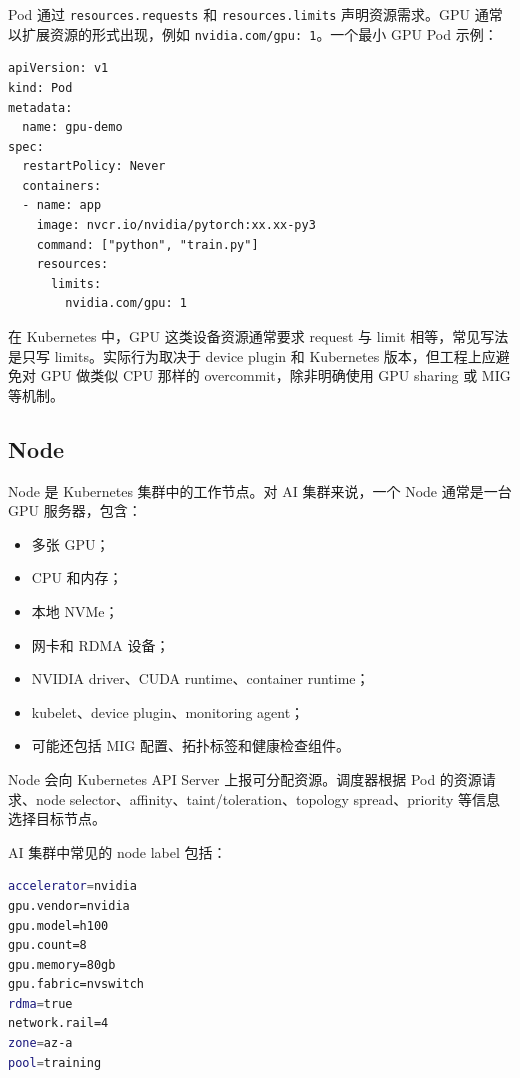 Pod 通过 \texttt{resources.requests} 和 \texttt{resources.limits} 声明资源需求。GPU 通常以扩展资源的形式出现，例如 \texttt{nvidia.com/gpu: 1}。一个最小 GPU Pod 示例：

\begin{lstlisting}[caption={请求 1 张 GPU 的 Pod 示例},label={lst:k8s-gpu-pod}]
apiVersion: v1
kind: Pod
metadata:
  name: gpu-demo
spec:
  restartPolicy: Never
  containers:
  - name: app
    image: nvcr.io/nvidia/pytorch:xx.xx-py3
    command: ["python", "train.py"]
    resources:
      limits:
        nvidia.com/gpu: 1
\end{lstlisting}

在 Kubernetes 中，GPU 这类设备资源通常要求 request 与 limit 相等，常见写法是只写 limits。实际行为取决于 device plugin 和 Kubernetes 版本，但工程上应避免对 GPU 做类似 CPU 那样的 overcommit，除非明确使用 GPU sharing 或 MIG 等机制。

\subsection{Node}
\label{subsec:node}

Node 是 Kubernetes 集群中的工作节点。对 AI 集群来说，一个 Node 通常是一台 GPU 服务器，包含：

\begin{itemize}
  \item 多张 GPU；
  \item CPU 和内存；
  \item 本地 NVMe；
  \item 网卡和 RDMA 设备；
  \item NVIDIA driver、CUDA runtime、container runtime；
  \item kubelet、device plugin、monitoring agent；
  \item 可能还包括 MIG 配置、拓扑标签和健康检查组件。
\end{itemize}

Node 会向 Kubernetes API Server 上报可分配资源。调度器根据 Pod 的资源请求、node selector、affinity、taint/toleration、topology spread、priority 等信息选择目标节点。

AI 集群中常见的 node label 包括：

\begin{lstlisting}[language=bash,caption={AI 集群常见 Node Label 示例},label={lst:ai-node-labels}]
accelerator=nvidia
gpu.vendor=nvidia
gpu.model=h100
gpu.count=8
gpu.memory=80gb
gpu.fabric=nvswitch
rdma=true
network.rail=4
zone=az-a
pool=training
\end{lstlisting}


